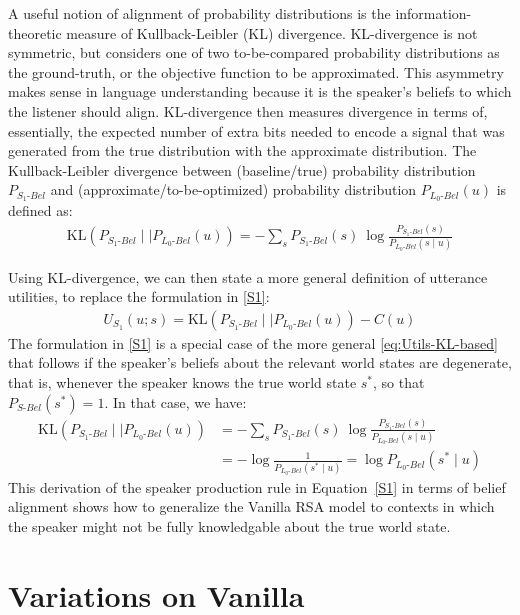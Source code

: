 \documentclass{sp}
\begin{document}
A useful notion of alignment of probability distributions is the information-theoretic
measure of Kullback-Leibler (KL) divergence. KL-divergence is not symmetric, but considers one of
two to-be-compared probability distributions as the ground-truth, or the objective function
to be approximated.
This asymmetry makes sense in language understanding because it is the speaker's
beliefs to which the listener should align. KL-divergence then measures divergence in terms of,
essentially, the expected number of extra bits needed to encode a signal that was generated
from the true distribution with the approximate distribution.
The Kullback-Leibler divergence between (baseline/true) probability distribution
$P_{S_{1}\text{-}Bel}$ and (approximate/to-be-optimized) probability distribution
$P_{L_{0}\text{-}Bel}(u)$ is defined as:
\begin{align}
  \label{eq:KL-divergence}
  \text{KL}(P_{S_{1}\text{-}Bel} \mid \mid P_{L_{0}\text{-}Bel}(u)) = - \sum_{s} P_{S_{1}\text{-}Bel}(s) \ \log \frac{P_{S_{1}\text{-}Bel}(s)}{P_{L_{0}\text{-}Bel}(s \mid u)}
\end{align}

Using KL-divergence, we can then state a more general definition of utterance utilities, to
replace the formulation in \eqref{S1}:
\begin{align}
  \label{eq:Utils-KL-based}
  U_{S_1}(u; s) = \text{KL}(P_{S_{1}\text{-}Bel} \mid \mid P_{L_{0}\text{-}Bel}(u)) - C(u)
\end{align}
The formulation in \eqref{S1} is a special case of the more general \eqref{eq:Utils-KL-based}
that follows if the speaker's beliefs about the relevant world states are degenerate, that is,
whenever the speaker knows the true world state $s^{*}$, so that $P_{S\text{-}Bel}(s^{*})=1$.
In that case, we have:
\begin{align*}
  \text{KL}(P_{S_{1}\text{-}Bel} \mid \mid P_{L_{0}\text{-}Bel}(u)) & = - \sum_{s} P_{S_{1}\text{-}Bel}(s) \ \log \frac{P_{S_{1}\text{-}Bel}(s)}{P_{L_{0}\text{-}Bel}(s \mid u)} \\
  & =  - \log\frac{1}{P_{L_{0}\text{-}Bel}(s^* \mid u)} = \log P_{L_{0}\text{-}Bel}(s^* \mid u)
\end{align*}
This derivation of the speaker production rule in Equation~\eqref{S1} in terms of belief alignment shows how to generalize the Vanilla RSA model to contexts in which the speaker might not be fully knowledgable about the true world state. 


\section{Variations on Vanilla} \label{variations}
\end{document}

